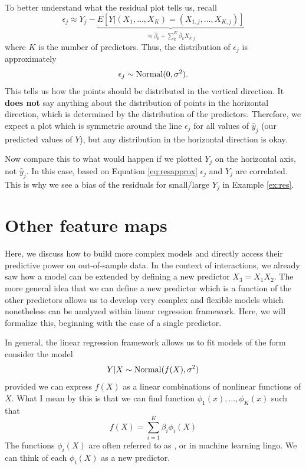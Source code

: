  To better understand what the residual plot tells us, recall
\begin{equation}\label{eq:resapprox}
\epsilon_j \approx Y_j - \underbrace{E[Y|(X_1,\dots,X_K) = (X_{1,j},\dots,X_{K,j})] }_{\approx \hat{\beta}_0 + \sum_k^{K}\hat{\beta}_kX_{k,j}}
\end{equation}
where $K$ is the number of predictors. 
Thus, the distribution of $\epsilon_j$ is approximately 
\begin{equation*}
\epsilon_j \sim {\rm Normal}(0,\sigma^2). 
\end{equation*}
This tells us how the points should be distributed in the vertical direction. It {\bf does not} say anything about the distribution of points in the horizontal direction, which is determined by the distribution of the predictors. Therefore, we expect a plot which is symmetric around the line $\epsilon_j$ for all values of $\hat{y}_j$ (our predicted values of $Y$), but any distribution in the horizontal direction is okay. 

Now compare this to what would happen if we plotted $Y_j$ on the horizontal axis, not $\hat{y}_j$. In this case, based on Equation \ref{eq:resapprox} $\epsilon_j$ and $Y_j$ are correlated. This is why we see a bias of the residuals for small/large $Y_j$ in Example \ref{ex:res}. 






\section{Other feature maps}

 Here, we discuss how to build more complex models and directly access their predictive power on out-of-sample data. 
In the context of interactions, we already saw how a model can be extended by defining a new predictor $X_3 = X_1X_2$. The more general idea that we can define a new predictor which is a function of the other predictors allows us to develop very complex and flexible models which nonetheless can be analyzed within linear regression framework. Here, we will formalize this, beginning with the case of a single predictor. 

In general, the linear regression framework allows us to fit models of the form consider the model
\begin{equation}\label{eq:nlgauss}
Y|X \sim {\rm Normal}( f(X),\sigma^2)
\end{equation}
provided we can express $f(X)$ as a linear combinations of nonlinear functions of $X$. What I mean by this is that we can find function $\phi_1(x),\dots,\phi_K(x)$ such that 
\begin{equation*}
f(X) = \sum_{i=1}^K \beta_i\phi_i(X)
\end{equation*}
The functions $\phi_i(X)$ are often referred to as , or  in machine learning lingo. We can think of each $\phi_i(X)$ as a new predictor. 



